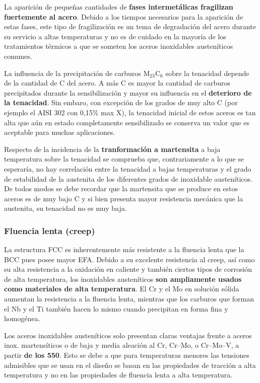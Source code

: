 La aparición de pequeñas cantidades de \textbf{fases intermetálicas fragilizan fuertemente al acero}. Debido a los tiempos necesarios para la aparición de estas fases, este tipo de fragilización es un tema de degradación del acero durante su servicio a altas temperaturas y no es de cuidado en la mayoría de los tratamientos térmicos a que se someten los aceros inoxidables austeníticos comunes.

La influencia de la precipitación de carburos M$_23$C$_6$ sobre la tenacidad depende de la cantidad de C del acero. A más C es mayor la cantidad de carburos precipitados durante la sensibilización y mayor su influencia en el \textbf{deterioro de la tenacidad}. Sin embaro, con excepción de los grados de muy alto C (por ejemplo el AISI 302 con 0,15\% max X), la tenacidad inicial de estos aceros es tan alta que aún en estado completamente sensibilizado se conserva un valor que es aceptable para muchas aplicaciones. 

Respecto de la incidencia de la \textbf{tranformación a martensita} a baja temperatura sobre la tenacidad se comprueba que, contrariamente a lo que se esperaría, no hay correlación entre la tenacidad a bajas temperaturas y el grado de estabilidad de la austenita de los diferentes grados de inoxidable austeníticos. De todos modos se debe recordar que la martensita que se produce en estos aceros es de muy bajo C y si bien presenta mayor resistencia mecánica que la austenita, su tenacidad no es muy baja.

\subsubsection{Fluencia lenta (creep)}

La estructura FCC es inherentemente más resistente a la fluencia lenta que la BCC pues posee mayor EFA. Debido a su excelente resistencia al creep, así como su alta resistencia a la oxidación en caliente y también ciertos tipos de corrosión de alta temperatura, los inoxidables austeníticos \textbf{son ampliamente usados como materiales de alta temperatura}. El Cr y el Mo en solución sólida aumentan la resistencia a la fluencia lenta, mientras que los carburos que forman el Nb y el Ti también hacen lo mismo cuando precipitan en forma fina y homogénea.

Los aceros inoxidables austeníticos solo presentan claras ventajas frente a aceros inox. martensíticos o de baja y media aleación al Cr, Cr--Mo, o Cr--Mo--V, a partir \textbf{de los 550\grad}. Esto se debe a que para temperaturas menores las tensiones admisibles que se usan en el diseño se basan en las propiedades de tracción a alta temperatura y no en las propiedades de fluencia lenta a alta temperatura.

